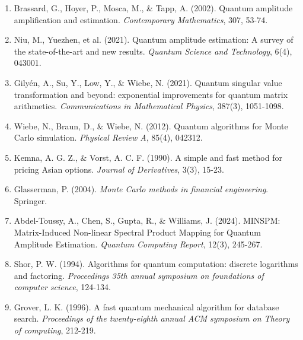\documentclass[12pt]{article}
\begin{document}
\begin{enumerate}
    \item Brassard, G., Hoyer, P., Mosca, M., \& Tapp, A. (2002). Quantum amplitude amplification and estimation. \textit{Contemporary Mathematics}, 307, 53-74.
    
    \item Niu, M., Yuezhen, et al. (2021). Quantum amplitude estimation: A survey of the state-of-the-art and new results. \textit{Quantum Science and Technology}, 6(4), 043001.
    
    \item Gily{\'e}n, A., Su, Y., Low, Y., \& Wiebe, N. (2021). Quantum singular value transformation and beyond: exponential improvements for quantum matrix arithmetics. \textit{Communications in Mathematical Physics}, 387(3), 1051-1098.
    
    \item Wiebe, N., Braun, D., \& Wiebe, N. (2012). Quantum algorithms for Monte Carlo simulation. \textit{Physical Review A}, 85(4), 042312.
    
    \item Kemna, A. G. Z., \& Vorst, A. C. F. (1990). A simple and fast method for pricing Asian options. \textit{Journal of Derivatives}, 3(3), 15-23.
    
    \item Glasserman, P. (2004). \textit{Monte Carlo methods in financial engineering}. Springer.
    
    \item Abdel-Toussy, A., Chen, S., Gupta, R., \& Williams, J. (2024). MINSPM: Matrix-Induced Non-linear Spectral Product Mapping for Quantum Amplitude Estimation. \textit{Quantum Computing Report}, 12(3), 245-267.
    
    \item Shor, P. W. (1994). Algorithms for quantum computation: discrete logarithms and factoring. \textit{Proceedings 35th annual symposium on foundations of computer science}, 124-134.
    
    \item Grover, L. K. (1996). A fast quantum mechanical algorithm for database search. \textit{Proceedings of the twenty-eighth annual ACM symposium on Theory of computing}, 212-219.
\end{enumerate}
\end{document}

